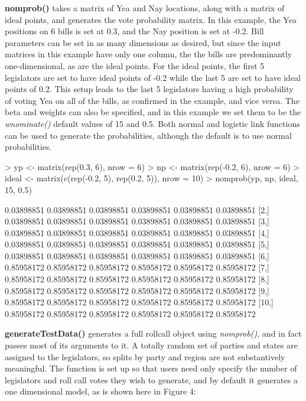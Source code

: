\documentclass[12pt]{article}
\begin{document}
\textbf{nomprob()} takes a matrix of Yea and Nay locations, along with
a matrix of ideal points, and generates the vote probability matrix.
In this example, the Yea positions on 6 bills is set at 0.3, and the Nay
position is set at -0.2.  Bill parameters can be set in as many dimensions
as desired, but since the input matrices in this example have only one
column, the the bills are predominantly one-dimensional, as are the ideal
points.  For the ideal points, the first 5 legislators are set to have ideal
points of -0.2 while the last 5 are set to have ideal points of 0.2. This
setup leads to the last 5 legislators having a high probability of voting
Yea on all of the bills, as confirmed in the example, and vice versa. The
beta and weights can also be specified, and in this example we set them to
be the \emph{wnominate()} default values of 15 and 0.5. Both normal and
logistic link functions can be used to generate the probabilities,
although the default is to use normal probabilities.

\begin{Schunk}
\begin{Sinput}
> yp <- matrix(rep(0.3, 6), nrow = 6)
> np <- matrix(rep(-0.2, 6), nrow = 6)
> ideal <- matrix(c(rep(-0.2, 5), rep(0.2, 5)), nrow = 10)
> nomprob(yp, np, ideal, 15, 0.5)
\end{Sinput}
\begin{Soutput}
            [,1]       [,2]       [,3]       [,4]       [,5]       [,6]
 [1,] 0.03898851 0.03898851 0.03898851 0.03898851 0.03898851 0.03898851
 [2,] 0.03898851 0.03898851 0.03898851 0.03898851 0.03898851 0.03898851
 [3,] 0.03898851 0.03898851 0.03898851 0.03898851 0.03898851 0.03898851
 [4,] 0.03898851 0.03898851 0.03898851 0.03898851 0.03898851 0.03898851
 [5,] 0.03898851 0.03898851 0.03898851 0.03898851 0.03898851 0.03898851
 [6,] 0.85958172 0.85958172 0.85958172 0.85958172 0.85958172 0.85958172
 [7,] 0.85958172 0.85958172 0.85958172 0.85958172 0.85958172 0.85958172
 [8,] 0.85958172 0.85958172 0.85958172 0.85958172 0.85958172 0.85958172
 [9,] 0.85958172 0.85958172 0.85958172 0.85958172 0.85958172 0.85958172
[10,] 0.85958172 0.85958172 0.85958172 0.85958172 0.85958172 0.85958172
\end{Soutput}
\end{Schunk}

\textbf{generateTestData()} generates a full rollcall object using
\emph{nomprob()}, and in fact passes most of its arguments to it.  A totally
random set of parties and states are assigned to the legislators, so splits
by party and region are not substantively meaningful.  The function is set up
so that users need only specify the number of legislators and roll call votes
they wish to generate, and by default it generates a one dimensional model, as is shown here
in Figure 4:
\end{document}
